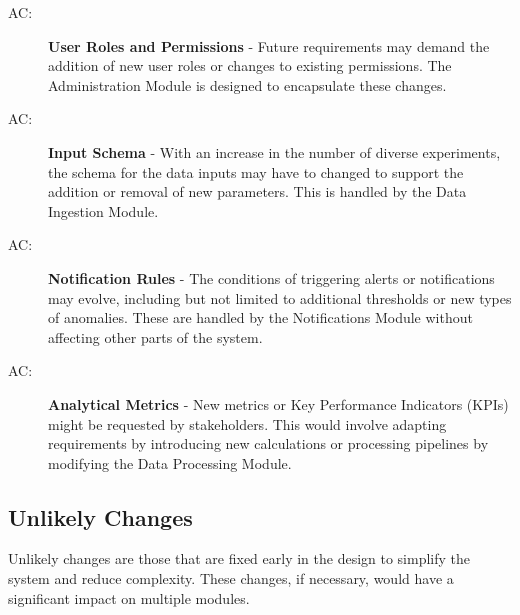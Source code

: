 \documentclass[12pt, titlepage]{article}
\newcounter{acnum}
\newcommand{\actheacnum}{AC\theacnum}
\begin{document}
\begin{description}
  \item[ \actheacnum \label{acRoles}:] \textbf{User Roles and Permissions} - 
  Future requirements may demand the addition of new user roles or changes to existing permissions.
  The Administration Module is designed to encapsulate these changes.

  \item[ \actheacnum \label{acSchema}:] \textbf{Input Schema} - 
  With an increase in the number of diverse experiments, the schema for the data inputs may have to
  changed to support the addition or removal of new parameters. This is handled by the Data Ingestion
  Module.

  \item[ \actheacnum \label{acNotifs}:] \textbf{Notification Rules} - 
  The conditions of triggering alerts or notifications may evolve, including but not limited to
  additional thresholds or new types of anomalies. These are handled by the Notifications Module
  without affecting other parts of the system.
  
  \item[ \actheacnum \label{acMetrics}:] \textbf{Analytical Metrics} - 
  New metrics or Key Performance Indicators (KPIs) might be requested by stakeholders. This would
  involve adapting requirements by introducing new calculations or processing pipelines by modifying
  the Data Processing Module.
  
\end{description}

\subsection{Unlikely Changes} \label{SecUchange}

Unlikely changes are those that are fixed early in the design to simplify the system
and reduce complexity. These changes, if necessary, would have a significant impact on
multiple modules.
\end{document}
